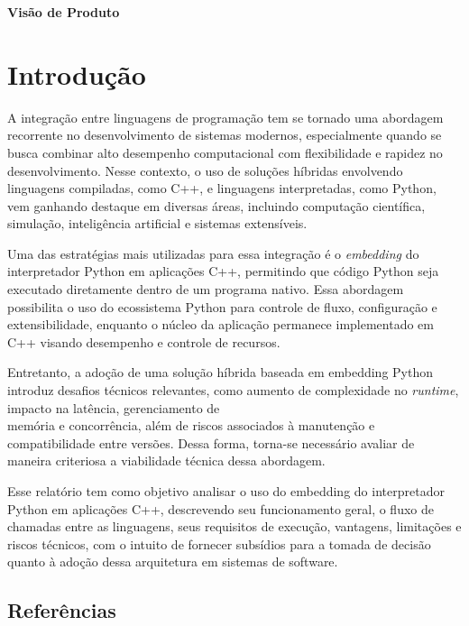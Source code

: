 \begin{center}
    \textbf{\Huge Visão de Produto}
\end{center}

\section{Introdução}
A integração entre linguagens de programação tem se tornado uma abordagem recorrente no desenvolvimento de sistemas modernos, especialmente quando se busca combinar alto desempenho computacional com flexibilidade e rapidez no desenvolvimento. Nesse contexto, o uso de soluções híbridas envolvendo linguagens compiladas, como C++, e linguagens interpretadas, como Python, vem ganhando destaque em diversas áreas, incluindo computação científica, simulação, inteligência artificial e sistemas extensíveis.

Uma das estratégias mais utilizadas para essa integração é o \textit{embedding} do interpretador Python em aplicações C++, permitindo que código Python seja executado diretamente dentro de um programa nativo. Essa abordagem possibilita o uso do ecossistema Python para controle de fluxo, configuração e extensibilidade, enquanto o núcleo da aplicação permanece implementado em C++ visando desempenho e controle de recursos.

Entretanto, a adoção de uma solução híbrida baseada em embedding Python introduz desafios técnicos relevantes, como aumento de complexidade no \emph{runtime}, impacto na latência, gerenciamento de \\memória e concorrência, além de riscos associados à manutenção e compatibilidade entre versões. Dessa forma, torna-se necessário avaliar de maneira criteriosa a viabilidade técnica dessa abordagem.

Esse relatório tem como objetivo analisar o uso do embedding do interpretador Python em aplicações C++, descrevendo seu funcionamento geral, o fluxo de chamadas entre as linguagens, seus requisitos de execução, vantagens, limitações e riscos técnicos, com o intuito de fornecer subsídios para a tomada de decisão quanto à adoção dessa arquitetura em sistemas de software.



\subsection{Referências}

